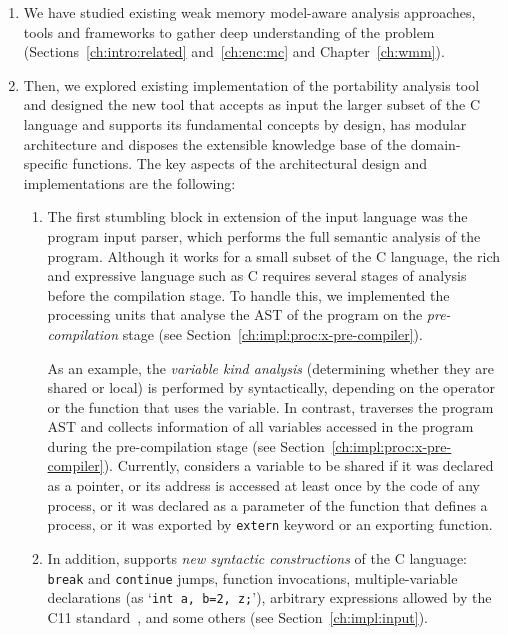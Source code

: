 \begin{enumerate}[label=\arabic*.] %
\item
We have studied existing weak memory model-aware analysis approaches, tools and frameworks to gather deep understanding of the problem (Sections~\ref{ch:intro:related} and~\ref{ch:enc:mc} and Chapter~\ref{ch:wmm}).

\item
Then, we explored existing implementation of the portability analysis tool \textit{\porthos{}} and designed the new tool \textit{\porthos[2]} that accepts as input the larger subset of the C language and supports its fundamental concepts by design, has modular architecture and disposes the extensible knowledge base of the domain-specific functions.
The key aspects of the architectural design and implementations are the following:

  \begin{enumerate}[label=\alph*.]
  \item The first stumbling block in extension of the input language was the \porthos[1] program input parser, which performs the full semantic analysis of the program.
  Although it works for a small subset of the C language, the rich and expressive language such as C requires several stages of analysis before the compilation stage.
  To handle this, we implemented the processing units that analyse the AST of the program on the \textit{pre-compilation} stage (see Section~\ref{ch:impl:proc:x-pre-compiler}).

  As an example, the \textit{variable kind analysis} (determining whether they are shared or local) is performed by \porthos[1] syntactically, depending on the operator or the function that uses the variable.
  In contrast, \porthos[2] traverses the program AST and collects information of all variables accessed in the program during the pre-compilation stage (see Section~\ref{ch:impl:proc:x-pre-compiler}).
  Currently, \porthos[2] considers a variable to be shared if it was declared as a pointer, or its address is accessed at least once by the code of any process, or it was declared as a parameter of the function that defines a process, or it was exported by \texttt{extern} keyword or an exporting function.

  \item In addition, \porthos[2] supports \textit{new syntactic constructions} of the C language: \texttt{break} and \texttt{continue} jumps, function invocations, multiple-variable declarations (as `\lstinline{int a, b=2, z;}'), arbitrary expressions allowed by the C11 standard~\cite{c11}, and some others (see Section~\ref{ch:impl:input}).


\end{enumerate}
\end{enumerate}
